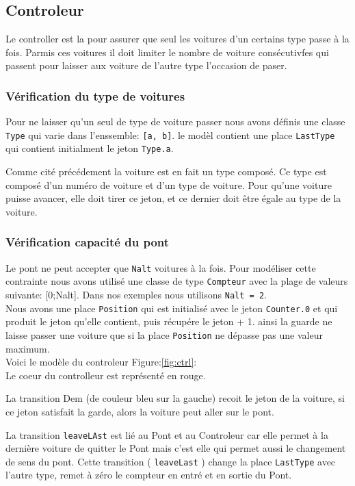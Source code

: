 \subsection{Controleur} %
Le controller est la pour assurer que seul les voitures d'un certains type passe à la fois. Parmis ces voitures il doit limiter le nombre de voiture consécutivfes qui passent pour laisser aux voiture de l'autre type l'occasion de paser.


\subsubsection{Vérification du type de voitures}
Pour ne laisser qu'un seul de type de voiture passer nous avons définis une classe \texttt{Type} qui varie dans l'enssemble: \texttt{[a, b]}. le modèl contient une place \texttt{LastType} qui contient initialment le jeton \texttt{Type.a}.

Comme cité précédement la voiture est en fait un type composé. Ce type est composé d'un numéro de voiture et d'un type de voiture. Pour qu'une voiture puisse avancer, elle doit tirer ce jeton, et ce dernier doit être égale au type de la voiture.

\subsubsection{Vérification capacité du pont}
Le pont ne peut accepter que \texttt{Nalt} voitures à la fois. Pour modéliser cette contrainte nous avons utilisé une classe de type \texttt{Compteur} avec la plage de valeurs suivante: [0;Nalt]. Dans nos exemples nous utilisons \texttt{Nalt = 2}.\\


Nous avons une place \texttt{Position} qui est initialisé avec le jeton \texttt{Counter.0} et qui produit le jeton qu'elle contient, puis récupére le jeton + 1. ainsi la guarde ne laisse passer une voiture que si la place \texttt{Position} ne dépasse  pas une valeur maximum.\\

Voici le modèle du controleur Figure:\ref{fig:ctrl}:\\
Le coeur du controlleur est représenté en rouge.

La transition Dem (de couleur bleu sur la gauche) recoit le jeton de la voiture, si ce jeton satisfait la garde, alors la voiture peut aller sur le pont.

La transition \texttt{leaveLAst} est lié au Pont et au Controleur car elle permet à la dernière voiture de quitter le Pont mais c'est elle qui permet aussi le changement de sens du pont. Cette transition ( \texttt{leaveLast} ) change la place \texttt{LastType} avec l'autre type, remet à zéro le compteur en entré et en sortie du Pont.

